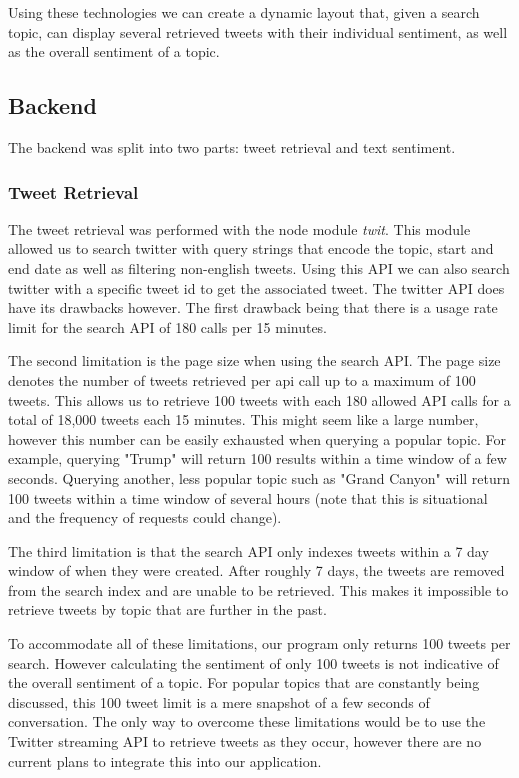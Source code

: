 Using these technologies we can create a dynamic layout that, given a search topic, can display several retrieved tweets with their individual sentiment, as well as the overall sentiment of a topic.

\subsection{Backend}
The backend was split into two parts: tweet retrieval and text sentiment. 

\subsubsection{Tweet Retrieval}
The tweet retrieval was performed with the node module {\em twit}. This module allowed us to search twitter with query strings that encode the topic, start and end date as well as filtering non-english tweets. Using this API we can also search twitter with a specific tweet id to get the associated tweet. The twitter API does have its drawbacks however. The first drawback being that there is a usage rate limit for the search API of 180 calls per 15 minutes. 

The second limitation is the page size when using the search API. The page size denotes the number of tweets retrieved per api call up to a maximum of 100 tweets. This allows us to retrieve 100 tweets with each 180 allowed API calls for a total of 18,000 tweets each 15 minutes. This might seem like a large number, however this number can be easily exhausted when querying a popular topic. For example, querying "Trump" will return 100 results within a time window of a few seconds. Querying another, less popular topic such as "Grand Canyon" will return 100 tweets within a time window of several hours (note that this is situational and the frequency of requests could change).

The third limitation is that the search API only indexes tweets within a 7 day window of when they were created. After roughly 7 days, the tweets are removed from the search index and are unable to be retrieved. This makes it impossible to retrieve tweets by topic that are further in the past.

To accommodate all of these limitations, our program only returns 100 tweets per search. However calculating the sentiment of only 100 tweets is not indicative of the overall sentiment of a topic. For popular topics that are constantly being discussed, this 100 tweet limit is a mere snapshot of a few seconds of conversation. The only way to overcome these limitations would be to use the Twitter streaming API to retrieve tweets as they occur, however there are no current plans to integrate this into our application.

